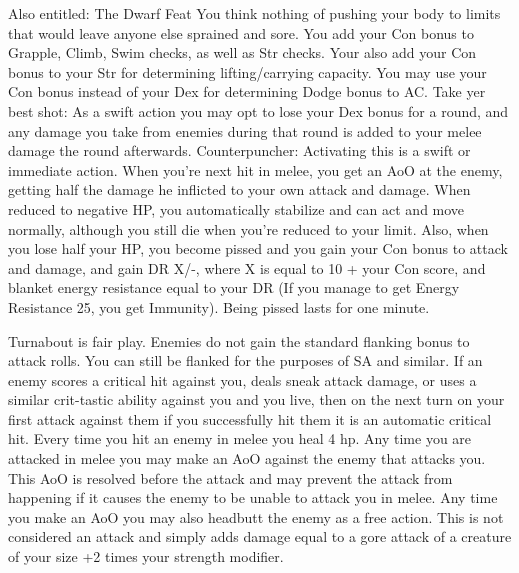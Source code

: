 \begin{multicols}{2}
\label{comm:feat:toughasnails}{}
{Also entitled: The Dwarf Feat
}{You think nothing of pushing your body to limits that would leave anyone else sprained and sore. You add your Con bonus to Grapple, Climb, Swim checks, as well as Str checks. Your also add your Con bonus to your Str for determining lifting/carrying capacity.
}{You may use your Con bonus instead of your Dex for determining Dodge bonus to AC.
}{Take yer best shot: As a swift action you may opt to lose your Dex bonus for a round, and any damage you take from enemies during that round is added to your melee damage the round afterwards.
}{Counterpuncher: Activating this is a swift or immediate action. When you're next hit in melee, you get an AoO at the enemy, getting half the damage he inflicted to your own attack and damage.
}{When reduced to negative HP, you automatically stabilize and can act and move normally, although you still die when you're reduced to your limit. Also, when you lose half your HP, you become pissed and you gain your Con bonus to attack and damage, and gain DR X/-, where X is equal to 10 + your Con score, and blanket energy resistance equal to your DR (If you manage to get Energy Resistance 25, you get Immunity). Being pissed lasts for one minute.}

\label{comm:feat:turnabout}{}
{Turnabout is fair play.
}{Enemies do not gain the standard flanking bonus to attack rolls. You can still be flanked for the purposes of SA and similar.
}{If an enemy scores a critical hit against you, deals sneak attack damage, or uses a similar crit-tastic ability against you and you live, then on the next turn on your first attack against them if you successfully hit them it is an automatic critical hit.
}{Every time you hit an enemy in melee you heal 4 hp.
}{Any time you are attacked in melee you may make an AoO against the enemy that attacks you. This AoO is resolved before the attack and may prevent the attack from happening if it causes the enemy to be unable to attack you in melee.
}{Any time you make an AoO you may also headbutt the enemy as a free action. This is not considered an attack and simply adds damage equal to a gore attack of a creature of your size +2 times your strength modifier.}


\end{multicols}
